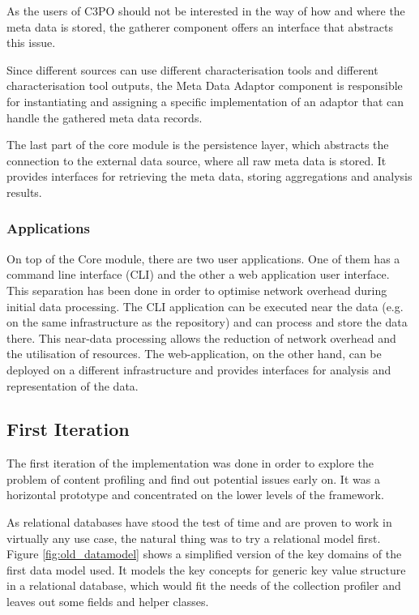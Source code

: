 As the users of C3PO should not be interested in the way of how and where the meta data is stored, the gatherer component offers an interface that abstracts this issue.

Since different sources can use different characterisation tools and different characterisation tool outputs, the Meta Data Adaptor component is responsible for instantiating and assigning a specific implementation of an adaptor that can handle the gathered meta data records. 

The last part of the core module is the persistence layer, which abstracts the connection to the external data source, where all raw meta data is stored. It provides interfaces for retrieving the meta data, storing aggregations and analysis results.

\subsubsection{Applications}
On top of the Core module, there are two user applications. One of them has a command line interface (CLI) and the other a  web application user interface. This separation has been done in order to optimise network overhead during initial data processing. The CLI application can be executed near the data (e.g. on the same infrastructure as the repository) and can process and store the data there. This near-data processing allows the reduction of network overhead and the utilisation of resources. The web-application, on the other hand, can be deployed on a different infrastructure and provides interfaces for analysis and representation of the data.

\subsection{First Iteration}
The first iteration of the implementation was done in order to explore the problem of content profiling and find out potential issues early on. It was a horizontal prototype and concentrated on the lower levels of the framework.

As relational databases have stood the test of time and are proven to work in virtually any use case, the natural thing was to try a relational model first. Figure \ref{fig:old_datamodel} shows a simplified version of the key domains of the first data model used. It models the key concepts for generic key value structure in a relational database, which would fit the needs of the collection profiler and leaves out some fields and helper classes. 

